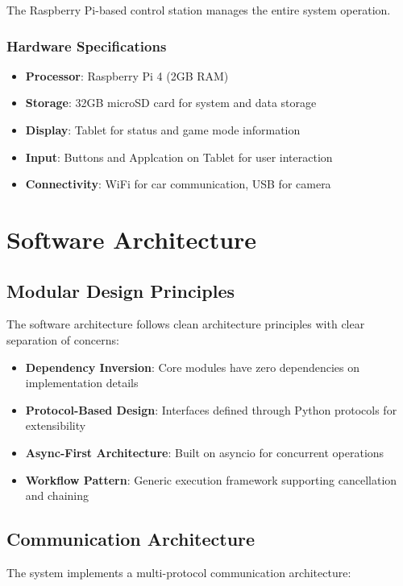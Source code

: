The Raspberry Pi-based control station manages the entire system operation.

\subsubsection{Hardware Specifications}
\begin{itemize}
    \item \textbf{Processor}: Raspberry Pi 4 (2GB RAM)
    \item \textbf{Storage}: 32GB microSD card for system and data storage
    \item \textbf{Display}: Tablet for status and game mode information
    \item \textbf{Input}: Buttons and Applcation on Tablet for user interaction
    \item \textbf{Connectivity}: WiFi for car communication, USB for camera
\end{itemize}

\section{Software Architecture}

\subsection{Modular Design Principles}

The software architecture follows clean architecture principles with clear separation of concerns:

\begin{itemize}
    \item \textbf{Dependency Inversion}: Core modules have zero dependencies on implementation details
    \item \textbf{Protocol-Based Design}: Interfaces defined through Python protocols for extensibility
    \item \textbf{Async-First Architecture}: Built on asyncio for concurrent operations
    \item \textbf{Workflow Pattern}: Generic execution framework supporting cancellation and chaining
\end{itemize}

\subsection{Communication Architecture}

The system implements a multi-protocol communication architecture:

